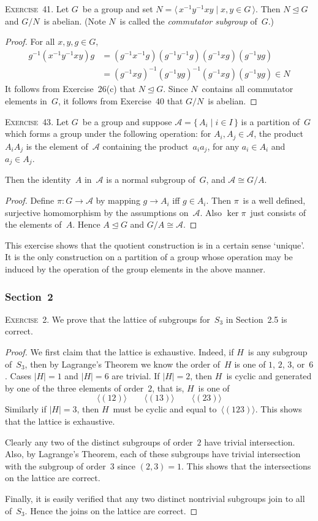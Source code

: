 \documentclass[letterpaper]{article}
\newcommand{\exercise}[1]{\goodbreak\noindent\textsc{Exercise~{#1}.}}
\newcommand{\A}{\mathcal{A}}
\newcommand{\iso}{\cong}
\newcommand{\normal}{\trianglelefteq}
\renewcommand{\gcd}[2]{({#1},{#2})}
\newcommand{\ord}[1]{|{#1}|}
\newcommand{\gen}[1]{\langle{#1}\rangle}
\begin{document}
\exercise{41}
Let $G$~be a group and set $N=\gen{\,x^{-1}y^{-1}xy\mid x,y\in G\,}$. Then $N\normal G$ and $G/N$~is abelian. (Note $N$~is called the \emph{commutator subgroup} of~$G$.)
\begin{proof}
For all $x,y,g\in G$,
\begin{align*}
g^{-1}(x^{-1}y^{-1}xy)g&=(g^{-1}x^{-1}g)(g^{-1}y^{-1}g)(g^{-1}xg)(g^{-1}yg)\\
	&=(g^{-1}xg)^{-1}(g^{-1}yg)^{-1}(g^{-1}xg)(g^{-1}yg)\in N
\end{align*}
It follows from Exercise~26(c) that $N\normal G$. Since $N$~contains all commutator elements in~$G$, it follows from Exercise~40 that $G/N$~is abelian.
\end{proof}

\exercise{43}
Let $G$~be a group and suppose $\A=\{\,A_i\mid i\in I\,\}$ is a partition of~$G$ which forms a group under the following operation: for $A_i,A_j\in\A$, the product~$A_iA_j$ is the element of~$\A$ containing the product~$a_ia_j$, for any $a_i\in A_i$ and $a_j\in A_j$.

Then the identity~$A$ in~$\A$ is a normal subgroup of~$G$, and $\A\iso G/A$.
\begin{proof}
Define $\pi:G\to\A$ by mapping $g\to A_i$ iff $g\in A_i$. Then $\pi$~is a well defined, surjective homomorphism by the assumptions on~$\A$. Also $\ker\pi$~just consists of the elements of~$A$. Hence $A\normal G$ and $G/A\iso\A$.
\end{proof}
\noindent This exercise shows that the quotient construction is in a certain sense `unique'. It is the only construction on a partition of a group whose operation may be induced by the operation of the group elements in the above manner.

\subsubsection*{Section~2}
\exercise{2}
We prove that the lattice of subgroups for~$S_3$ in Section~2.5 is correct.
\begin{proof}
We first claim that the lattice is exhaustive. Indeed, if $H$~is any subgroup of~$S_3$, then by Lagrange's Theorem we know the order of~$H$ is one of $1$, $2$, $3$, or~$6$. Cases $\ord{H}=1$ and $\ord{H}=6$ are trivial. If $\ord{H}=2$, then $H$~is cyclic and generated by one of the three elements of order~$2$, that is, $H$~is one of
$$\gen{(12)}\qquad\gen{(13)}\qquad\gen{(23)}$$
Similarly if $\ord{H}=3$, then $H$~must be cyclic and equal to~$\gen{(123)}$. This shows that the lattice is exhaustive.

Clearly any two of the distinct subgroups of order~$2$ have trivial intersection. Also, by Lagrange's Theorem, each of these subgroups have trivial intersection with the subgroup of order~$3$ since $\gcd{2}{3}=1$. This shows that the intersections on the lattice are correct.

Finally, it is easily verified that any two distinct nontrivial subgroups join to all of~$S_3$. Hence the joins on the lattice are correct.
\end{proof}
\end{document}

